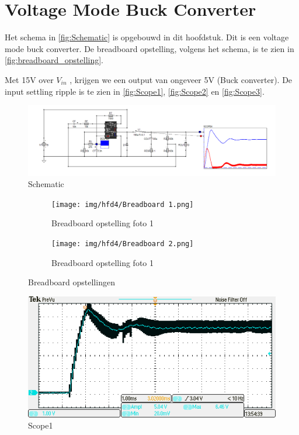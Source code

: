 \section{Voltage Mode Buck Converter}
Het schema in \autoref{fig:Schematic} is opgebouwd in dit hoofdstuk. Dit is een voltage mode buck converter. De breadboard opstelling, volgens het schema, is te zien in \autoref{fig:breadboard_opstelling}. 

Met 15V over \(V_{in}\) , krijgen we een output van ongeveer 5V (Buck converter). De input settling ripple is te zien in \autoref{fig:Scope1}, \autoref{fig:Scope2} en \autoref{fig:Scope3}. 

\begin{figure}[b]
    \centering
    \includegraphics[width=0.8\linewidth]{img/hfd4/Schematic.png}
    \caption{Schematic}
    \label{fig:Schematic}
\end{figure}


\begin{figure}[h!]
    \centering
    \begin{subfigure}[b]{0.45\linewidth}
        \centering
        \texttt{[image: img/hfd4/Breadboard 1.png]}
        \caption{Breadboard opstelling foto 1}
        \label{fig:Breadboard 1}
    \end{subfigure}%
    \hfill
    \begin{subfigure}[b]{0.45\linewidth}
        \centering
        \texttt{[image: img/hfd4/Breadboard 2.png]}
        \caption{Breadboard opstelling foto 1}
        \label{fig:Breadboard 2}
    \end{subfigure}
    
    \caption{Breadboard opstellingen}
    \label{fig:breadboard_opstelling}
\end{figure}

\begin{figure}[b]
    \centering
    \includegraphics[width=0.6\linewidth]{img/hfd4/Scope/TEK00002.PNG}
    \caption{Scope1}
    \label{fig:Scope1}
\end{figure}

